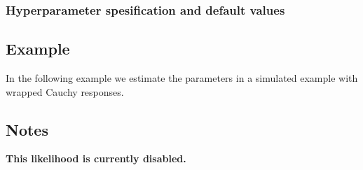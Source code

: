\documentclass[a4paper,11pt]{article}
\begin{document}
\subsubsection*{Hyperparameter spesification and default values}


\subsection*{Example}

In the following example we estimate the parameters in a simulated
example with wrapped Cauchy responses.


\subsection*{Notes}

{\LARGE\textbf{This likelihood is currently disabled.}}
\end{document}
